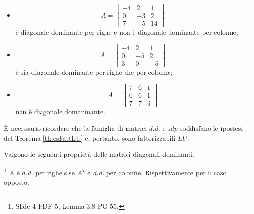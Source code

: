 \begin{example}
    \begin{itemize}
        \item
        \begin{equation*}
            A=
            \begin{bmatrix}
                -4 & 2 & 1\\
                0 & -3 & 2\\
                7 & -5 & 14
            \end{bmatrix}
        \end{equation*} è diagonale dominante per righe e non è diagonale dominante per colonne;
        \item
        \begin{equation*}
            A=
            \begin{bmatrix}
                -4 & 2 & 1\\
                0 & -5 & 2\\
                3 & 0 & -5
            \end{bmatrix}
        \end{equation*} è sia diagonale dominante per righe che per colonne;
        \item 
        \begin{equation*}
            A=
            \begin{bmatrix}
                7 & 6 & 1\\
                0 & 6 & 1\\
                7 & 7 & 6
            \end{bmatrix}
        \end{equation*} non è diagonale domaninante.
    \end{itemize}
\end{example}

È necessario ricordare che la famiglia di matrici \textit{d.d.} e \textit{sdp} soddisfano le ipostesi del Teorema \ref{th:esFattLU} e, pertanto, sono fattorizzabili $LU$.

Valgono le seguenti proprietà delle matrici diagonali dominanti.
\begin{theorem}\label{th:AddSSeATDD}\footnote{Slide 4 PDF 5, Lemma 3.8 PG 55.}
    $A$ è \textit{d.d.} per righe s.se $A^T$ è \textit{d.d.} per colonne. Rispettivamente per il caso opposto.
\end{theorem}

